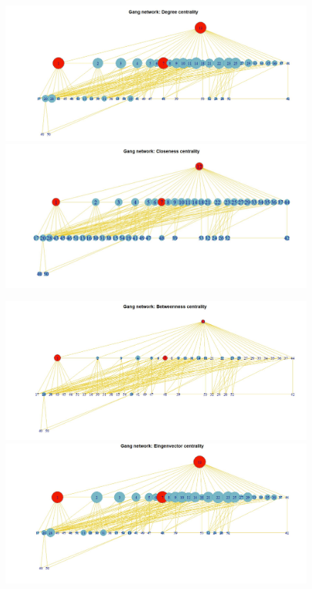 \documentclass[11pt,a4paper]{report}
\begin{document}
\begin{figure}
		\centering
	\includegraphics[scale =0.5]{degree}
	\includegraphics[scale =0.5]{closeness}

	
\end{figure}
\begin{figure}
	\centering
	\includegraphics[scale =0.5]{betweeness}
	\includegraphics[scale =0.5]{ein}
\end{figure}
\end{document}
